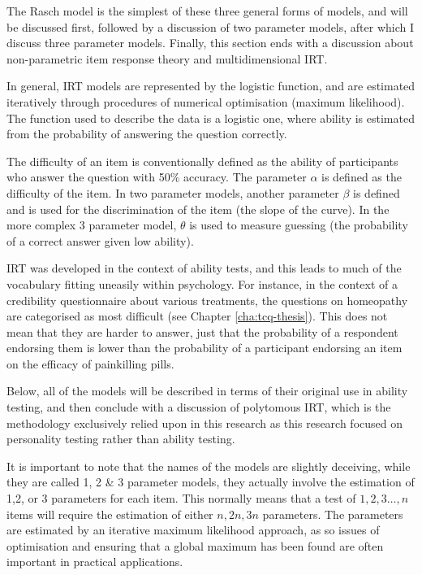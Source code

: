 The Rasch model is the simplest of these three general forms of models, and will be discussed first, followed by a discussion of two parameter models, after which I discuss three parameter models. Finally, this section ends with a discussion about non-parametric item response theory and multidimensional IRT.

In general, IRT models are represented by the logistic function, and are estimated iteratively through procedures of numerical optimisation (maximum likelihood). The function used to describe the data is a logistic one, where ability is estimated from the probability of answering the question correctly.

The difficulty of an item is conventionally defined as the ability of participants who answer the question with 50\% accuracy. The parameter $\alpha$ is defined as the difficulty of the item. In two parameter models, another parameter $\beta$ is defined and is used for the discrimination of the item (the slope of the curve). In the more complex 3 parameter model, $\theta$ is used to measure guessing (the probability of a correct answer given low ability)\cite{van1997handbook}.

IRT was developed in the context of ability tests, and this leads to much of the vocabulary fitting uneasily within psychology. For instance, in the context of a credibility questionnaire about various treatments, the questions on homeopathy are categorised as most difficult (see Chapter \ref{cha:tcq-thesis}). This does not mean that they are harder to answer, just that the probability of a respondent endorsing them is lower than the probability of a participant endorsing an item on the efficacy of painkilling pills.

Below, all of the models will be described in terms of their original use in ability testing, and then conclude with a discussion of polytomous IRT, which is the methodology exclusively relied upon in this research as this research focused on personality testing rather than ability testing.

It is important to note that the names of the models are slightly deceiving, while they are called 1, 2 \& 3 parameter models, they actually involve the estimation of 1,2, or 3 parameters for each item. This normally means that a test of ${1,2,3\ldots, n}$ items will require the estimation of either ${n, 2n, 3n}$ parameters. The parameters are estimated by an iterative maximum likelihood approach, as so issues of optimisation and ensuring that a global maximum has been found are often important in practical applications\cite{gill2002bayesian}.


